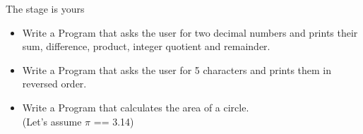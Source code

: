 \begin{frame}{The stage is yours}
	\begin{itemize}
		\item Write a Program that asks the user for two decimal numbers and prints their sum, difference, product, integer quotient and remainder.
		\item Write a Program that asks the user for 5 characters and prints them in reversed order.
		\item Write a Program that calculates the area of a circle.\\(Let's assume $\pi$ == 3.14)
	\end{itemize}
\end{frame}

